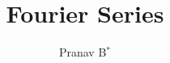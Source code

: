 \documentclass[journal,12pt,twocolumn]{IEEEtran}
\begin{document}
\providecommand{\dec}[2]{\ensuremath{\overset{#1}{\underset{#2}{\gtrless}}}}
\makeatletter
{}
\makeatother
\let\StandardTheFigure\thefigure
\renewcommand{\thefigure}{\theproblem}
\def\putbox#1#2#3{\makebox[0in][l]{\makebox[#1][l]{}\raisebox{\baselineskip}[0in][0in]{\raisebox{#2}[0in][0in]{#3}}}}
     \def\rightbox#1{\makebox[0in][r]{#1}}
     \def\centbox#1{\makebox[0in]{#1}}
     \def\topbox#1{\raisebox{-\baselineskip}[0in][0in]{#1}}
     \def\midbox#1{\raisebox{-0.5\baselineskip}[0in][0in]{#1}}
\vspace{3cm}
\title{ 
Fourier Series
}
%
%
%
\author{ Pranav B$^{*}$ %
}
% 
%
\end{document}
